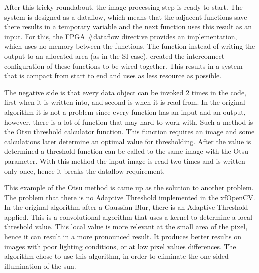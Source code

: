 After this tricky roundabout, the image processing step is ready to start.
The system is designed as a dataflow, which means that the adjacent functions save there results in a temporary variable and the next function uses this result as an input.
For this, the FPGA \#dataflow directive provides an implementation, which uses no memory between the functions.
The function instead of writing the output to an allocated area (as in the SI case), created the interconnect configuration of these functions to be wired together.
This results in a system that is compact from start to end and uses as less resource as possible.

The negative side is that every data object can be invoked 2 times in the code, first when it is written into, and second is when it is read from.
In the original algorithm it is not a problem since every function has an input and an output, however, there is a lot of function that may hard to work with.
Such a method is the Otsu \cite{4310076} threshold calculator function.
This function requires an image and some calculations later determine an optimal value for thresholding.
After the value is determined a threshold function can be called to the same image with the Otsu parameter.
With this method the input image is read two times and is written only once, hence it breaks the dataflow requirement.

This example of the Otsu method is came up as the solution to another problem.
The problem that there is no Adaptive Threshold implemented in the xfOpenCV.
In the original algorithm after a Gaussian Blur, there is an Adaptive Threshold \cite{pratt2001digital} \cite{yanowitz1989new} applied.
This is a convolutional algorithm that uses a kernel to determine a local threshold value.
This local value is more relevant at the small area of the pixel, hence it can result in a more pronounced result.
It produces better results on images with poor lighting conditions, or at low pixel values differences.
The algorithm chose to use this algorithm, in order to eliminate the one-sided illumination of the sun.

